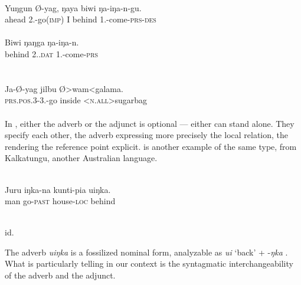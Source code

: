 \newpage
\ea\label{ex:E64}
 \\
 \ea
 \gll Yuŋgun  Ø-yag,  ŋaya  biwi  ŋa-iŋa-n-gu.\\
  ahead  2.\glsg-go(\textsc{imp})  I  behind  1.\glsg-come-\textsc{prs}-\textsc{des}\\
\\
\ex
\gll  Biwi  ŋaŋga  ŋa-iŋa-n.\\
   behind  2.\glsg.\textsc{dat}  1.\glsg-come-\textsc{prs}\\
\\
\z
\z
\noindent \ea\label{ex:E65}
\\
\gll Ja-Ø-yag  jilbu  Ø{\textgreater}wam{\textless}galama.\\
 \textsc{prs}.\textsc{pos}.3-3.\glsg-go  inside  {\textless}\textsc{n}.\textsc{all}{\textgreater}sugarbag\\
\\
\z
\noindent In , either the adverb or the \np adjunct is optional — either can stand alone. They specify each other, the adverb expressing more precisely the local relation, the \np rendering the reference point explicit.  is another example of the same type, from Kalkatungu, another Australian language.

\ea\label{ex:E66}
 \\
\gll Juru  iŋka-na  kunti-pia  uiŋka.\\
man  go-\textsc{past}  house-\textsc{loc}  behind\\
\\
\z
\noindent %

\begin{exe} %
	\glt id.
\end{exe}


\noindent\label{page96}The adverb \textit{uiŋka} is a fossilized nominal form, analyzable as \textit{ui} ‘back’ + -\textit{ŋka} \glloc. What is particularly telling in our context is the syntagmatic interchangeability of the adverb and the \np adjunct.

